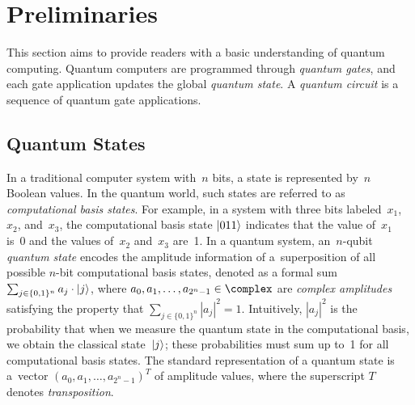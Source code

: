 \section{Preliminaries}
\vspace{-0.0mm}
This section aims to provide readers with a basic understanding of quantum computing. Quantum computers are programmed through \emph{quantum gates}, and each gate
application updates the global \emph{quantum state}. A \emph{quantum circuit} is
a sequence of quantum gate applications.

\vspace{-0.0mm}
\subsection{Quantum States} 
\vspace{-0.0mm}

In a traditional computer system with~$n$ bits, a state is represented by~$n$ Boolean values. 
In the quantum world, such states are referred to as \emph{computational basis
states}.
For example, in a system with three bits labeled~$x_1$, $x_2$, and~$x_3$, the computational basis 
state $\ket{011}$ indicates that the value of~$x_1$ is~0 and the values of~$x_2$ and~$x_3$ are~1.
In a quantum system, an~$n$-qubit \emph{quantum state} encodes
the amplitude information of a~superposition of all possible
$n$-bit computational basis states,
denoted as a formal sum 
$\sum_{j \in \{0,1\}^n} a_j\cdot\ket{j}$, where $a_0,a_1,\ldots,a_{2^n-1} \in
\complex$ are \emph{complex amplitudes} satisfying the property that
$\sum_{j \in \{0,1\}^n} |a_j|^2 = 1$.
Intuitively, $|a_j|^2$ is the probability
that when we measure the quantum state in the computational basis, we obtain the
classical state~$\ket{j}$; these probabilities must sum up to~1 for all
computational basis states. The standard representation of a quantum state is
a~vector $(a_0,a_1,\ldots, a_{2^n-1})^T$ of amplitude values, where the
superscript $T$ denotes \emph{transposition}.

